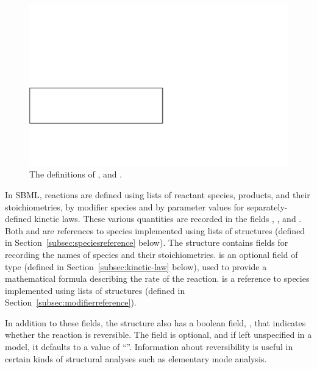 \documentclass[10pt,twocolumntoc]{cekarticle}
\begin{document}
\begin{figure}[htb]
  \centering
  \includegraphics[scale = 0.68]{reaction}
  \caption{The definitions of ,  and
    .}
  \label{fig:reaction}
\end{figure}

In SBML, reactions are defined using lists of reactant species,
products, and their stoichiometries, by modifier species and by
parameter values for separately-defined kinetic laws.  These
various quantities are recorded in the fields ,
,  and .  Both
 and  are references to species
implemented using lists of  structures
(defined in Section~\ref{subsec:speciesreference} below).  The
 structure contains fields for recording
the names of species and their stoichiometries.
 is an optional field of type
 (defined in Section~\ref{subsec:kinetic-law}
below), used to provide a mathematical formula describing the rate
of the reaction.   is a reference to species
implemented using lists of  structures
(defined in Section~\ref{subsec:modifierreference}).

In addition to these fields, the  structure also has a
boolean field, , that indicates whether the reaction is
reversible.  The field is optional, and if left unspecified in a model, it
defaults to a value of ``''.  Information about
reversibility is useful in certain kinds of structural analyses such as
elementary mode analysis.
\end{document}
